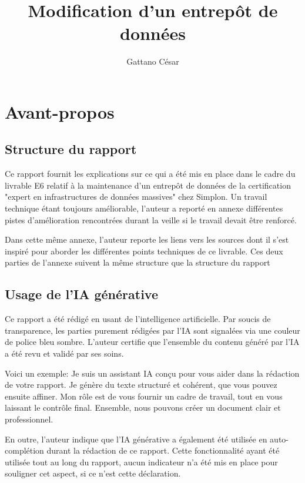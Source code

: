 \documentclass[11pt]{article}
\newcommand{\ia}[1]{{\color{MidnightBlue}#1}}
\begin{document}
\title{Modification d'un entrepôt de données}
\author{Gattano César}
\maketitle

\section*{Avant-propos}

\subsection*{Structure du rapport}

Ce rapport fournit les explications sur ce qui a été mis en place dans le cadre du livrable E6 relatif à la maintenance d'un entrepôt de données de la certification "expert en infrastructures de données massives" chez Simplon. Un travail technique étant toujours améliorable, l'auteur a reporté en annexe différentes pistes d'amélioration rencontrées durant la veille si le travail devait être renforcé.

Dans cette même annexe, l'auteur reporte les liens vers les sources
dont il s'est inspiré pour aborder les différentes points techniques
de ce livrable. Ces deux parties de l'annexe suivent la même structure que la structure du rapport


\subsection*{Usage de l'IA générative}

Ce rapport a été rédigé en usant de l'intelligence artificielle. Par soucis de transparence, les parties purement rédigées par l'IA sont
signalées via une couleur de police bleu sombre. L'auteur certifie que l'ensemble du contenu généré par l'IA a été revu et validé par ses
soins.

Voici un exemple: \ia{Je suis un assistant IA conçu pour vous aider dans la rédaction de votre rapport. Je génère du texte structuré et cohérent, que vous pouvez ensuite affiner. Mon rôle est de vous fournir un cadre de travail, tout en vous laissant le contrôle final. Ensemble, nous pouvons créer un document clair et professionnel.
}

En outre, l'auteur indique que l'IA générative a également été utilisée en auto-complétion durant la rédaction de ce rapport. Cette fonctionnalité ayant été utilisée tout au long du rapport, aucun indicateur n'a été mis en place pour souligner cet aspect, si ce n'est cette déclaration.
\end{document}
